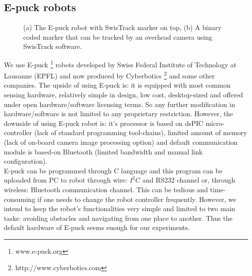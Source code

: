 \subsection{E-puck robots}
\begin{figure}[htp]
\centering
\hspace{0.25cm}
\caption{(a) The E-puck robot with SwisTrack marker on top, (b) A binary coded marker that can be tracked by an overhead camera  using SwisTrack software.}
\label{fig:e-puck}
\end{figure}
We use E-puck \footnote{www.e-puck.org} robots developed by Swiss Federal Institute of Technology at Lausanne (EPFL) and now produced by Cyberbotics \footnote{http://www.cyberbotics.com} and some other companies. The upside of using E-puck is: it is equipped with most common sensing hardware, relatively simple in design, low cost, desktop-sized and offered under open hardware/software licensing terms. So any further modification in hardware/software is not limited to any proprietary restriction. However, the downside of using E-puck robot is: it's processor is based on dsPIC micro-controller (lack of standard programming tool-chains), limited amount of memory (lack of on-board camera image processing option) and default communication module is based-on Bluetooth (limited bandwidth and manual link configuration).\\
E-puck can be programmed through C language and this program can be uploaded from PC to robot through wire: $I^{2}C$ and RS232 channel or, through  wireless: Bluetooth communication channel. This can be tedious and time-consuming if one needs to change the robot controller frequently. However, we intend to keep the robot's functionalities very simple and limited to two main tasks: avoiding obstacles and navigating from one place to another. Thus the default hardware of E-puck seems enough for our experiments.\\ 
